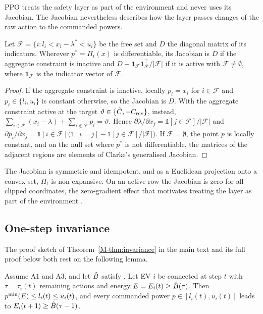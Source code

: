 PPO treats the safety layer as part of the environment and never uses its Jacobian.
The Jacobian nevertheless describes how the layer passes changes of the raw action to the commanded powers.

\begin{proposition}\label{prop:jacobian}
Let $\mathcal F=\{i:l_i<x_i-\lambda^{*}<u_i\}$ be the free set and $D$ the diagonal matrix of its indicators.
Wherever $p^{*}=\Pi_t(x)$ is differentiable, its Jacobian is $D$ if the aggregate constraint is inactive and $D-\mathbf 1_{\mathcal F}\mathbf 1_{\mathcal F}^\top/|\mathcal F|$ if it is active with $\mathcal F\neq\emptyset$, where $\mathbf 1_{\mathcal F}$ is the indicator vector of $\mathcal F$.
\end{proposition}

\begin{proof}
If the aggregate constraint is inactive, locally $p_i=x_i$ for $i\in\mathcal F$ and $p_i\in\{l_i,u_i\}$ is constant otherwise, so the Jacobian is $D$.
With the aggregate constraint active at the target $\vartheta\in\{\tilde C,-C_{\mathrm{rev}}\}$, instead, $\sum_{i\in\mathcal F}(x_i-\lambda)+\sum_{i\notin\mathcal F}p_i=\vartheta$.
Hence $\partial\lambda/\partial x_j=\mathbb 1[j\in\mathcal F]/|\mathcal F|$ and $\partial p_i/\partial x_j=\mathbb 1[i\in\mathcal F]\big(\mathbb 1[i=j]-\mathbb 1[j\in\mathcal F]/|\mathcal F|\big)$.
If $\mathcal F=\emptyset$, the point $p$ is locally constant, and on the null set where $p^{*}$ is not differentiable, the matrices of the adjacent regions are elements of Clarke's generalised Jacobian.
\end{proof}

The Jacobian is symmetric and idempotent, and as a Euclidean projection onto a convex set, $\Pi_t$ is non-expansive.
On an active row the Jacobian is zero for all clipped coordinates, the zero-gradient effect that motivates treating the layer as part of the environment \cite{kasaura2023benchmarking}.

\subsection{One-step invariance}\label{app:onestep}

The proof sketch of Theorem~\ref{M-thm:invariance} in the main text and its full proof below both rest on the following lemma.

\begin{lemma}\label{lem:onestep}
Assume A1 and A3, and let $\hat B$ satisfy .
Let EV $i$ be connected at step $t$ with $\tau=\tau_i(t)$ remaining actions and energy $E=E_i(t)\ge\hat B(\tau)$.
Then $p^{\min}(E)\le l_i(t)\le u_i(t)$, and every commanded power $p\in[l_i(t),u_i(t)]$ leads to $E_i(t+1)\ge\hat B(\tau-1)$.
\end{lemma}

